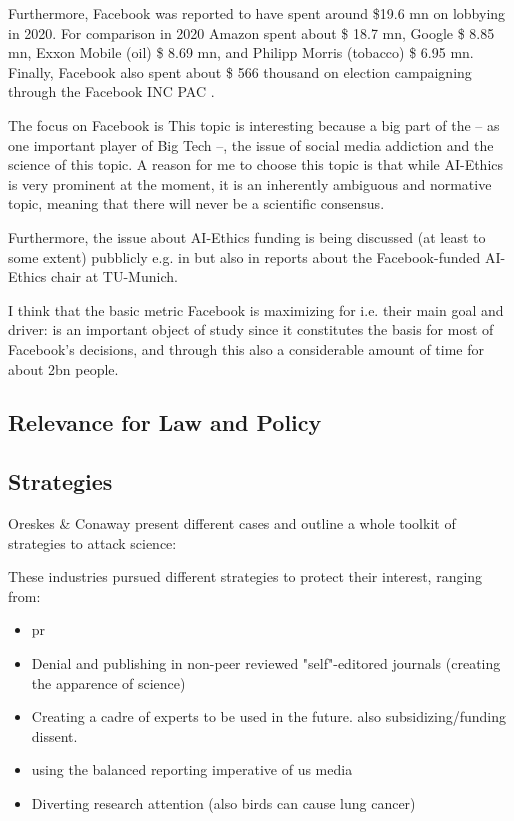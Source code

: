 Furthermore, Facebook was reported to have spent around \$19.6 \gls{mn} on lobbying in 2020.
For comparison in 2020 Amazon spent about \$ 18.7 \gls{mn}, Google \$ 8.85 \gls{mn}, Exxon Mobile (oil) \$ 8.69 \gls{mn}, and Philipp Morris (tobacco) \$ 6.95 \gls{mn}. 
Finally, Facebook also spent about \$ 566 thousand on election campaigning through the Facebook INC PAC .




The focus on Facebook is 
This topic is interesting because a big part of the 
 -- as one important player of Big Tech --, the issue of social media addiction and the science of this topic.
A reason for me to choose this topic is that while AI-Ethics is very prominent at the moment, it is an inherently ambiguous and normative topic, meaning that there will never be a scientific consensus. 

Furthermore, the issue about AI-Ethics funding is being discussed (at least to some extent) pubblicly e.g. in \citep{abdalla_grey_2021} but also in reports about the Facebook-funded AI-Ethics chair at TU-Munich.

I think that the basic metric Facebook is maximizing for i.e. their main goal and driver:  is an important object of study since it constitutes the basis for most of Facebook's decisions, and through this also a considerable amount of time for about 2bn people.


\subsection{Relevance for Law and Policy}


\subsection{Strategies}
Oreskes \& Conaway present different cases and outline a whole toolkit of strategies to attack science:

These industries pursued different strategies to protect their interest, ranging from:
\begin{itemize}
\item \gls{pr}
\item Denial and publishing in non-peer reviewed "self"-editored journals (creating the apparence of science)
\item Creating a cadre of experts to be used in the future. also subsidizing/funding dissent.
\item using the balanced reporting imperative of us media
\item Diverting research attention (also birds can cause lung cancer) 
\end{itemize}


